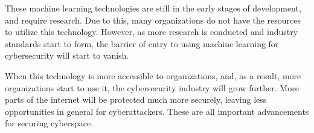 These machine learning technologies are still in the early stages of development, and require research.
Due to this, many organizations do not have the resources to utilize this technology.
However, as more research is conducted and industry standards start to form, the barrier of entry to using machine learning for cybersecurity will start to vanish.

When this technology is more accessible to organizations, and, as a result, more organizations start to use it, the cybersecurity industry will grow further.
More parts of the internet will be protected much more securely, leaving less opportunities in general for cyberattackers.
These are all important advancements for securing cyberspace.
